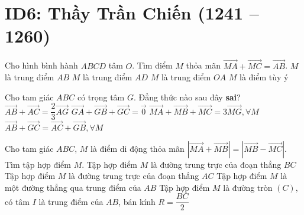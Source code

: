 \section*{ID6: Thầy Trần Chiến (1241 -- 1260)}
\begin{ex}%
	Cho hình bình hành $ABCD$ tâm $O$. Tìm điểm $M$ thỏa mãn $\vec{MA}+\vec{MC}=\vec{AB}$.
	\choice
	{$M$ là trung điểm $AB$}
	{\True $M$ là trung điểm $AD$}
	{$M$ là trung điểm $OA$}
	{$M$ là điểm tùy ý}
\end{ex}

\begin{ex}%
	Cho tam giác $ABC$ có trọng tâm $G$. Đẳng thức nào sau đây \textbf{sai}?
	\choice
	{\True $\vec{AB}+\vec{AC}=\dfrac{2}{3}\vec{AG}$}
	{$\vec{GA}+\vec{GB}+\vec{GC}=\vec{0}$}
	{$\vec{MA}+\vec{MB}+\vec{MC}=3\vec{MG}, \forall M$}
	{$\vec{AB}+\vec{GC}=\vec{AC}+\vec{GB}, \forall M$}
\end{ex}

\begin{ex}%
	Cho tam giác $ABC$, $M$ là điểm di động thỏa mãn $|\vec{MA}+\vec{MB}|=|\vec{MB}-\vec{MC}|$. Tìm tập hợp điểm $M$.
	\choice
	{Tập hợp điểm $M$ là đường trung trực của đoạn thẳng $BC$}
	{Tập hợp điểm $M$ là đường trung trực của đoạn thẳng $AC$}
	{Tập hợp điểm $M$ là một đường thẳng qua trung điểm của $AB$}
	{\True Tập hợp điểm $M$ là đường tròn $(C)$, có tâm $I$ là trung điểm của $AB$, bán kính $R =\dfrac{BC}{2}$}
\end{ex}

